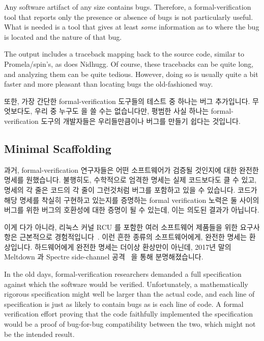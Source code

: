 Any software artifact of any size contains bugs.
Therefore, a formal-verification tool that reports only the
presence or absence of bugs is not particularly useful.
What is needed is a tool that gives at least \emph{some} information
as to where the bug is located and the nature of that bug.

The  output includes a traceback mapping back to the source
code, similar to Promela/spin's, as does Nidhugg.
Of course, these tracebacks can be quite long, and analyzing them
can be quite tedious.
However, doing so is usually quite a bit faster
and more pleasant than locating bugs the old-fashioned way.
\fi

또한, 가장 간단한 formal-verification 도구들의 테스트 중 하나는 버그
추가입니다.
무엇보다도, 우리 중 누구도  을 쓸 수는 없습니다만,
평범한 사실 하나는 formal-verification 도구의 개발자들은 우리들만큼이나 버그를
만들기 쉽다는 것입니다.
\iffalse

In addition, one of the simplest tests of formal-verification tools is
bug injection.
After all, not only could any of us write
\co{printf("VERIFIED\\n")}, but the plain fact is that
developers of formal-verification tools are just as bug-prone as
are the rest of us.
\fi

\subsection{Minimal Scaffolding}
\label{sec:future:Minimal Scaffolding}

과거, formal-verification 연구자들은 어떤 소프트웨어가 검증될 것인지에 대한
완전한 명세를 원했습니다.
불행히도, 수학적으로 엄격한 명세는 실제 코드보다도 클 수 있고, 명세의 각 줄은
코드의 각 줄이 그런것처럼 버그를 포함하고 있을 수 있습니다.
코드가 해당 명세를 착실히 구현하고 있는지를 증명하는 formal verification 노력은
둘 사이의 버그를 위한 버그의 호환성에 대한 증명이 될 수 있는데, 이는 의도된
결과가 아닙니다.

이게 다가 아니라, 리눅스 커널 RCU 를 포함한 여러 소프트웨어 제품들을 위한
요구사항은 근본적으로
경험적입니다~\cite{PaulEMcKenney2015RCUreqts1,PaulEMcKenney2015RCUreqts2,PaulEMcKenney2015RCUreqts3}.
이런 흔한 종류의 소프트웨어에게, 완전한 명세는 환상입니다.
하드웨어에게 완전한 명세는 더이상 환상만이 아닌데, 2017년 말의 Meltdown 과
Spectre side-channel 공격~\cite{JannHorn2018MeltdownSpectre} 을 통해
분명해졌습니다.
\iffalse

In the old days, formal-verification researchers demanded a full
specification against which the software would be verified.
Unfortunately, a mathematically rigorous specification might well
be larger than the actual code, and each line of specification
is just as likely to contain bugs as is each line of code.
A formal verification effort proving that the code faithfully
implemented the specification would be a proof of bug-for-bug
compatibility between the two, which might not be the intended
result.


